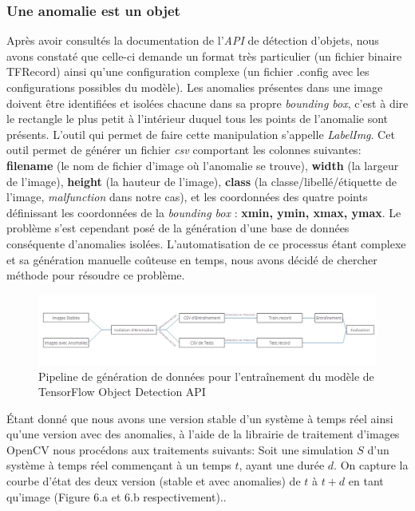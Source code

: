 \documentclass[french]{article}
\theoremstyle{mytheoremstyle}
\theoremstyle{mytheoremstyle}
\theoremstyle{myproblemstyle}
\begin{document}
        \subsubsection{Une anomalie est un objet}
        Après avoir consultés la documentation de l'\emph{API} de détection d'objets, nous avons constaté que celle-ci demande un format très particulier (un fichier binaire TFRecord) ainsi qu'une configuration complexe (un fichier .config avec les configurations possibles du modèle). Les anomalies présentes dans une image doivent être identifiées et isolées chacune dans sa propre \emph{bounding box}, c'est à dire le rectangle le plus petit à l'intérieur duquel tous les points de l'anomalie sont présents. L'outil qui permet de faire cette manipulation s'appelle \emph{LabelImg}. Cet outil permet de générer un fichier \emph{csv} comportant les colonnes suivantes: \textbf{filename} (le nom de fichier d'image où l'anomalie se trouve), \textbf{width} (la largeur de l'image), \textbf{height} (la hauteur de l'image), \textbf{class} (la classe/libellé/étiquette de l'image, \emph{malfunction} dans notre cas), et les coordonnées des quatre points définissant les coordonnées de la \emph{bounding box} : \textbf{xmin, ymin, xmax, ymax}. Le problème s'est cependant posé de la génération d'une  base de données conséquente d'anomalies isolées. L'automatisation de ce processus étant complexe et sa génération manuelle coûteuse en temps, nous avons décidé de chercher méthode pour résoudre ce problème.
        \begin{figure}[H]
            \centering
            \includegraphics[width=\textwidth]{images/od_datagen.jpg}
            \caption{Pipeline de génération de données pour l'entraînement du modèle de TensorFlow Object Detection API}
            \label{}
        \end{figure}
        \indent Étant donné que nous avons une version stable d'un système à temps réel ainsi qu'une version avec des anomalies, à l'aide de la librairie de traitement d'images OpenCV nous procédons aux traitements suivants:
        \newline
        Soit une simulation $S$ d'un système à temps réel commençant à un temps $t$, ayant une durée $d$. On capture la courbe d'état des deux version (stable et avec anomalies) de $t$ à $t+d$ en tant qu'image (Figure 6.a et 6.b respectivement)..
\end{document}
